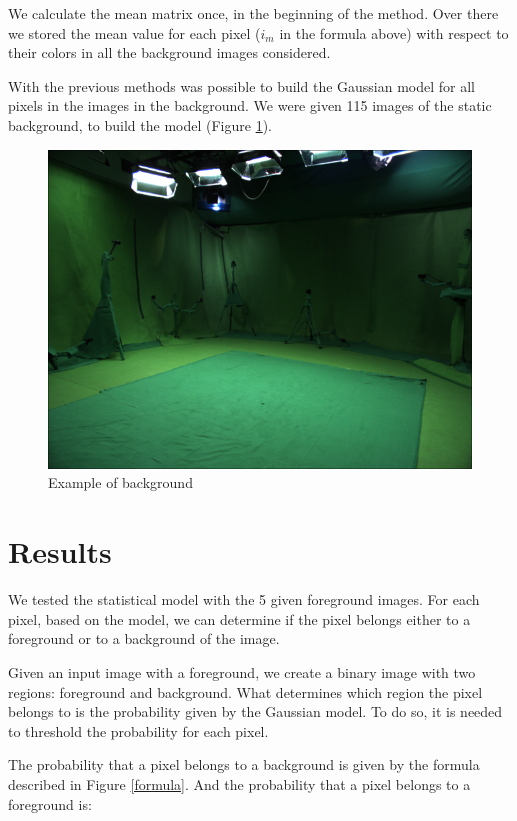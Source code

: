 \documentclass{article}
\begin{document}
We calculate the mean matrix once, in the beginning of the method. Over there we stored the mean value for each pixel (\textit{$i_m$} in the formula above) with respect to their colors in all the background images considered.

With the previous methods was possible to build the Gaussian model for all pixels in the images in the background. We were given 115 images of the static background, to build the model (Figure \ref{background}).

	\begin{figure} [H]
		\centering
		\includegraphics[scale=0.3]{img/img_000000}
		\caption{Example of background\label{background}}
	\end{figure}


\section{Results}
	We tested the statistical model with the 5 given foreground images. For each pixel, based on the model, we can determine if the pixel belongs either to a foreground or to a background of the image.

	Given an input image with a foreground, we create a binary image with two regions: foreground and background. What determines which region the pixel belongs to is the probability given by the Gaussian model. To do so, it is needed to threshold the probability for each pixel.

	The probability that a pixel belongs to a background is given by the formula described in Figure \ref{formula}. And the probability that a pixel belongs to a foreground is:
\end{document}
